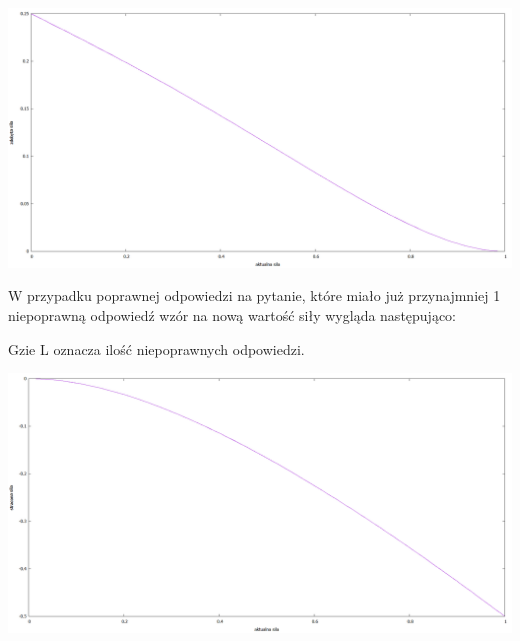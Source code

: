 
\begin{center}
	\centering
	\includegraphics[width=\textwidth]{images/WinStrength.png}
\end{center}

W przypadku poprawnej odpowiedzi na pytanie, które miało już przynajmniej 1 niepoprawną odpowiedź wzór na nową wartość siły wygląda następująco: \\


Gzie L oznacza ilość niepoprawnych odpowiedzi.

\begin{center}
	\centering
	\includegraphics[width=\textwidth]{images/LossStrength.png}
\end{center}

